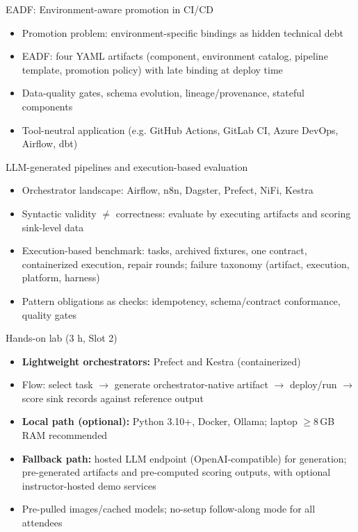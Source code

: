 \documentclass[aspectratio=169]{beamer}
\begin{document}
\begin{frame}{EADF: Environment-aware promotion in CI/CD}
  \begin{itemize}
    \item Promotion problem: environment-specific bindings as hidden technical debt
    \item EADF: four YAML artifacts (component, environment catalog, pipeline template, promotion policy) with late binding at deploy time
    \item Data-quality gates, schema evolution, lineage/provenance, stateful components
    \item Tool-neutral application (e.g. GitHub Actions, GitLab CI, Azure DevOps, Airflow, dbt)
  \end{itemize}
\end{frame}

\begin{frame}{LLM-generated pipelines and execution-based evaluation}
  \begin{itemize}
    \item Orchestrator landscape: Airflow, n8n, Dagster, Prefect, NiFi, Kestra
    \item Syntactic validity $\neq$ correctness: evaluate by executing artifacts and scoring sink-level data
    \item Execution-based benchmark: tasks, archived fixtures, one contract, containerized execution, repair rounds; failure taxonomy (artifact, execution, platform, harness)
    \item Pattern obligations as checks: idempotency, schema/contract conformance, quality gates
  \end{itemize}
\end{frame}

\begin{frame}{Hands-on lab (3 h, Slot 2)}
  \begin{itemize}
    \item \textbf{Lightweight orchestrators:} Prefect and Kestra (containerized)
    \item Flow: select task $\rightarrow$ generate orchestrator-native artifact $\rightarrow$ deploy/run $\rightarrow$ score sink records against reference output
    \item \textbf{Local path (optional):} Python 3.10+, Docker, Ollama; laptop $\geq$8\,GB RAM recommended
    \item \textbf{Fallback path:} hosted LLM endpoint (OpenAI-compatible) for generation; pre-generated artifacts and pre-computed scoring outputs, with optional instructor-hosted demo services
    \item Pre-pulled images/cached models; no-setup follow-along mode for all attendees
  \end{itemize}
\end{frame}
\end{document}

